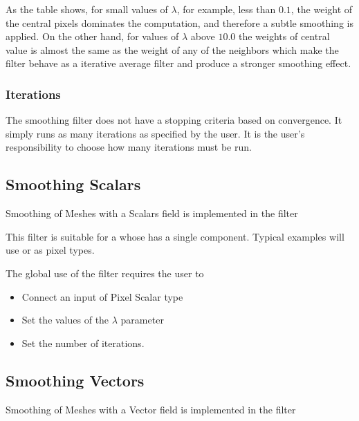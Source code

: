 \documentclass{InsightArticle}
\begin{document}
As the table shows, for small values of $\lambda$, for example, less than
$0.1$, the weight of the central pixels dominates the computation, and
therefore a subtle smoothing is applied. On the other hand, for values of
$\lambda$ above $10.0$ the weights of central value is almost the same as the
weight of any of the neighbors which make the filter behave as a iterative
average filter and produce a stronger smoothing effect.


\subsubsection{Iterations}

The smoothing filter does not have a stopping criteria based on convergence. It
simply runs as many iterations as specified by the user. It is the user's
responsibility to choose how many iterations must be run.


\subsection{Smoothing Scalars}

Smoothing of Meshes with a Scalars field is implemented in the filter

\begin{center}
\end{center}

This filter is suitable for a  whose  has a
single component. Typical examples will use  or  as
pixel types.

The global use of the filter requires the user to

\begin{itemize}
\item Connect an input  of Pixel Scalar type
\item Set the values of the $\lambda$ parameter
\item Set the number of iterations.
\end{itemize}


\subsection{Smoothing Vectors}

Smoothing of Meshes with a Vector field is implemented in the filter

\begin{center}
\end{center}
\end{document}
